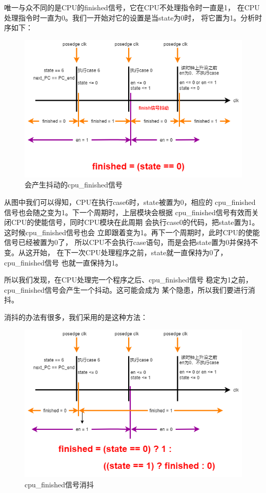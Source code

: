 \documentclass[12pt,a4paper,UTF8]{article}
\begin{document}
唯一与众不同的是CPU的finished信号，它在CPU不处理指令时一直是1，
在CPU处理指令时一直为0。我们一开始对它的设置是当state为0时，
将它置为1。分析时序如下：
\begin{figure}[H]
  \centering
  \includegraphics[width=1\textwidth]{cpu_finished_jitter.png}
  \caption{会产生抖动的cpu\_finished信号}
  \label{jitter}
\end{figure}

从图中我们可以得知，CPU在执行case6时，state被置为0，相应的
cpu\_finished信号也会随之变为1。下一个周期时，上层模块会根据
cpu\_finished信号有效而关闭CPU的使能信号，同时CPU模块在此周期
会执行case0的代码，把state置为1。这时候cpu\_finished信号也会
立即跟着变为1。再下一个周期时，此时CPU的使能信号已经被置为0了，
所以CPU不会执行case语句，而是会把state置为0并保持不变。从这开始，
在下一次CPU处理程序之前，state就一直保持为0了，cpu\_finished信号
也就一直保持为1。

所以我们发现，在CPU处理完一个程序之后、cpu\_finished信号
稳定为1之前，cpu\_finished信号会产生一个抖动。这可能会成为
某个隐患，所以我们要进行消抖。

消抖的办法有很多，我们采用的是这种方法：
\begin{figure}[H]
  \centering
  \includegraphics[width=1\textwidth]{cpu_finished_debounce.png}
  \caption{cpu\_finished信号消抖}
  \label{debounce}
\end{figure}
\end{document}
